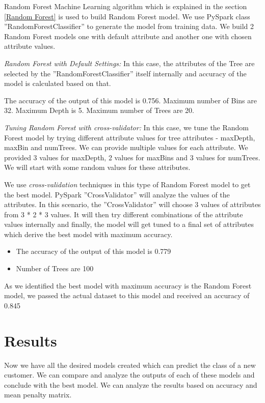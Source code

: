 \documentclass[sigconf]{acmart}
\begin{document}
Random Forest Machine Learning algorithm which is explained in the section \ref{Random Forest} is used to build Random Forest model. We use PySpark class ''RandomForestClassifier'' to generate the model from training data. We build 2 Random Forest models one with default attribute and another one with chosen attribute values. 

\textit{Random Forest with Default Settings:} In this case, the attributes of the Tree are selected by the ''RandomForestClassifier'' itself internally and accuracy of the model is calculated based on that.

The accuracy of the output of this model is 0.756. Maximum number of Bins are 32. Maximum Depth is 5. Maximum number of Trees are 20.


\textit{Tuning Random Forest with cross-validator:} In this case, we tune the Random Forest model by trying different attribute values for tree attributes - maxDepth, maxBin and numTrees. We can provide multiple values for each attribute. We provided 3 values for maxDepth, 2 values for maxBins and 3 values for numTrees. We will start with some random values for these attributes. 

We use \emph{cross-validation} techniques in this type of Random Forest model to get the best model. PySpark ''CrossValidator'' will analyze the values of the attributes. In this scenario, the ''CrossValidator'' will choose 3 values of attributes from 3 * 2 * 3 values. It will then try different combinations of the attribute values internally and finally, the model will get tuned to a final set of attributes which derive the best model with maximum accuracy. 

\begin{itemize}
   \item The accuracy of the output of this model is 0.779
   \item Number of Trees are 100
\end{itemize}

As we identified the best model with maximum accuracy is the Random Forest model, we passed the actual dataset to this model and received an accuracy of 0.845

\section{Results}

Now we have all the desired models created which can predict the class of a new customer. We can compare and analyze the outputs of each of these models and conclude with the best model. We can analyze the results based on accuracy and mean penalty matrix.
\end{document}
